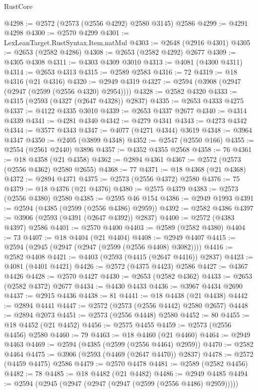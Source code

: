 \begin{lexlean}{RustCore}
\begin{coremodule}
@4298 := @2572 (@2573 (@2556 @4292) @2580 @3145) @2586
@4299 := @4291 @4298
@4300 := @2570 @4299
@4301 := LexLeanTarget.RustSyntax.Item.natMul
@4303 := @2648 (@2916 @4301)
@4305 := @2653 (@2582 @4286)
@4308 := @2653 (@2582 @4292) @2677
@4309 := @4305 @4308
@4311 := @4303 @4309 @3010
@4313 := @4081 (@4300 @4311)
@4314 := @2653 @4313
@4315 := @2589 @2583
@4316 := 72
@4319 := @18 @4316 (@21 @4316)
@4320 := @2949 @4319
@4327 := @2594 (@3908 (@2947 (@2947 (@2599 (@2556 @4320) @2954))))
@4328 := @2582 @4320
@4333 := @4315 (@2593 (@4327 (@2647 @4328)) @2837)
@4335 := @2653 @4333 @4275
@4337 := @4122 @4335 @3010
@4339 := @2653 @4337 @2677
@4340 := @4314 @4339
@4341 := @4281 @4340
@4342 := @4279 @4341
@4343 := @4273 @4342
@4344 := @3577 @4343
@4347 := @4077 (@4271 @4344) @3619
@4348 := @3964 @4347
@4350 := @2405 (@3899 @4348)
@4352 := @2547 (@2550 @166)
@4355 := @2554 (@2561 @2440) @3896
@4357 := @4352 @4355 @2568
@4358 := 76
@4361 := @18 @4358 (@21 @4358)
@4362 := @2894 @4361
@4367 := @2572 (@2573 (@2556 @4362) @2580 @2655)
@4368 := 77
@4371 := @18 @4368 (@21 @4368)
@4372 := @2894 @4371
@4375 := @2573 (@2556 @4372) @2580
@4376 := 75
@4379 := @18 @4376 (@21 @4376)
@4380 := @2575 @4379
@4383 := @2573 (@2556 @4380) @2580
@4385 := @2595 @46 @154
@4386 := @2949 @1993
@4391 := @2594 (@4385 (@2599 (@2556 @4386) @2959))
@4392 := @2582 @4386
@4397 := @3906 (@2593 (@4391 (@2647 @4392)) @2837)
@4400 := @2572 (@4383 @4397) @2586
@4401 := @2570 @4400
@4403 := @2589 (@2582 @4380)
@4404 := 73
@4407 := @18 @4404 (@21 @4404)
@4408 := @2949 @4407
@4415 := @2594 (@2945 (@2947 (@2947 (@2599 (@2556 @4408) @3082))))
@4416 := @2582 @4408
@4421 := @4403 (@2593 (@4415 (@2647 @4416)) @2837)
@4423 := @4081 (@4401 @4421)
@4426 := @2572 (@4375 @4423) @2586
@4427 := @4367 @4426
@4428 := @2570 @4427
@4430 := @2653 (@2582 @4362)
@4433 := @2653 (@2582 @4372) @2677
@4434 := @4430 @4433
@4436 := @3967 @4434 @2690
@4437 := @2915 @4436
@4438 := 81
@4441 := @18 @4438 (@21 @4438)
@4442 := @2894 @4441
@4447 := @2572 (@2573 (@2556 @4442) @2580 @2657)
@4448 := @2894 @2073
@4451 := @2573 (@2556 @4448) @2580
@4452 := 80
@4455 := @18 @4452 (@21 @4452)
@4456 := @2575 @4455
@4459 := @2573 (@2556 @4456) @2580
@4460 := 79
@4463 := @18 @4460 (@21 @4460)
@4464 := @2949 @4463
@4469 := @2594 (@4385 (@2599 (@2556 @4464) @2959))
@4470 := @2582 @4464
@4475 := @3906 (@2593 (@4469 (@2647 @4470)) @2837)
@4478 := @2572 (@4459 @4475) @2586
@4479 := @2570 @4478
@4481 := @2589 (@2582 @4456)
@4482 := 78
@4485 := @18 @4482 (@21 @4482)
@4486 := @2949 @4485
@4494 := @2594 (@2945 (@2947 (@2947 (@2947 (@2599 (@2556 @4486) @2959)))))

\end{coremodule}
\end{lexlean}
